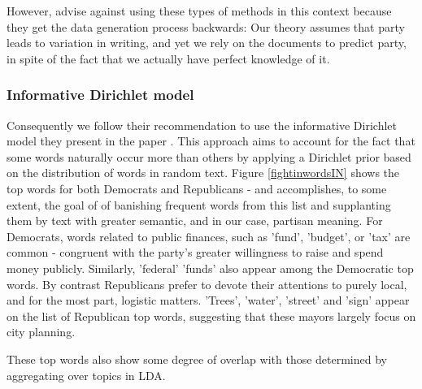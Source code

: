 \documentclass[11pt]{article}
\begin{document}
However, \cite{Monroe2008} advise against using these types of methods in this context because they get the data generation process backwards: Our theory assumes that party leads to variation in writing, and yet we rely on the documents to predict party, in spite of the fact that we actually have perfect knowledge of it.

\subsubsection{Informative Dirichlet model}
Consequently we follow their recommendation to use the informative Dirichlet model they present in the paper \citep{Monroe2008}. This approach aims to account for the fact that some words naturally occur more than others by applying a Dirichlet prior based on the distribution of words in random text. Figure \ref{fightinwordsIN} shows the top words for both Democrats and Republicans - and accomplishes, to some extent, the goal of \citep{Monroe2008} of banishing frequent words from this list and supplanting them by text with greater semantic, and in our case, partisan meaning. For Democrats, words related to public finances, such as 'fund', 'budget', or 'tax' are common - congruent with the party's greater willingness to raise and spend money publicly. Similarly, 'federal' 'funds' also appear among the Democratic top words. By contrast Republicans prefer to devote their attentions to purely local, and for the most part, logistic matters. 'Trees', 'water', 'street' and 'sign' appear on the list of Republican top words, suggesting that these mayors largely focus on city planning.

These top words also show some degree of overlap with those determined by aggregating over topics in LDA.
\end{document}
